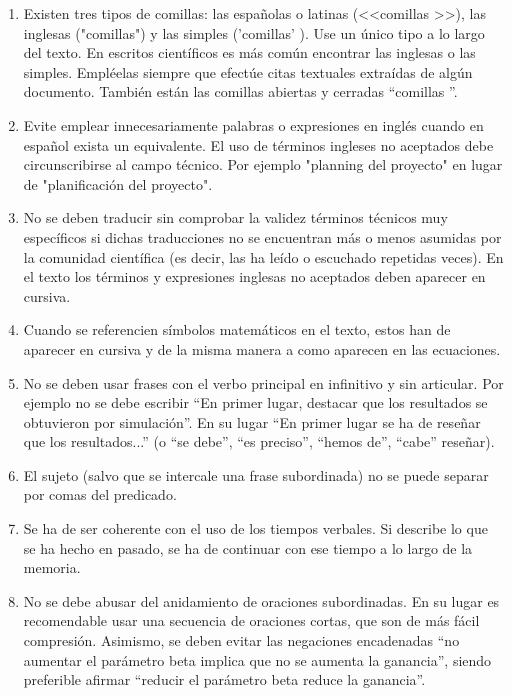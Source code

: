 \begin{enumerate}
\item Existen tres tipos de comillas: las españolas o latinas (<<comillas >>), las inglesas ("comillas") y las simples ('comillas' ). Use un único tipo a lo largo del texto. En escritos científicos es más común encontrar las inglesas o las simples. Empléelas siempre que efectúe citas textuales extraídas de algún documento.  También están las comillas abiertas y cerradas ``comillas ''.


\item Evite   emplear   innecesariamente   palabras   o   expresiones   en   inglés cuando  en  español  exista  un  equivalente.  El  uso  de  términos  ingleses  no aceptados debe circunscribirse al campo técnico. Por ejemplo "planning del proyecto" en lugar de "planificación del proyecto".

\item No se deben traducir sin comprobar la validez términos técnicos muy específicos si dichas traducciones no se encuentran más o menos asumidas por la comunidad científica (es decir, las   ha   leído   o   escuchado   repetidas   veces).   En   el   texto   los   términos   y expresiones inglesas no aceptados deben aparecer en cursiva.

\item Cuando  se  referencien  símbolos  matemáticos  en  el  texto,  estos  han  de aparecer   en   cursiva   y   de   la   misma   manera   a   como   aparecen   en   las ecuaciones.

\item No se deben usar frases con el verbo principal en infinitivo y sin articular. Por ejemplo no se debe escribir  “En  primer  lugar,  destacar  que  los  resultados  se  obtuvieron  por simulación”. En su lugar  “En primer  lugar se ha  de  reseñar que  los resultados...” (o “se debe”, “es preciso”, “hemos de”, “cabe” reseñar).

\item El sujeto (salvo que se intercale una frase subordinada) no se puede separar por comas del predicado.

\item Se ha de ser   coherente  con  el  uso  de  los  tiempos  verbales.  Si  describe  lo  que  se  ha hecho en pasado, se ha de continuar  con ese tiempo a lo largo de la memoria.

\item No se debe abusar del  anidamiento  de oraciones  subordinadas.  En  su  lugar  es recomendable  usar  una  secuencia  de  oraciones  cortas,  que  son  de  más  fácil compresión. Asimismo, se deben evitar las negaciones encadenadas
“no  aumentar  el  parámetro  beta  implica  que  no  se  aumenta  la  ganancia”, siendo preferible afirmar “reducir el parámetro beta reduce la ganancia”.


\end{enumerate}
